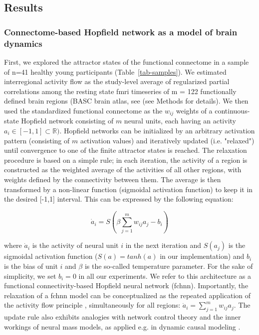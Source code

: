 \documentclass{article}
\begin{document}
\subsection{Results}

\subsubsection{Connectome-based Hopfield network as a model of brain dynamics}

First, we explored the attractor states of the functional connectome in a sample of n=41 healthy young
participants (Table~\ref{tab-samples}). We estimated interregional activity flow \citep{cole2016activity, ito2017cognitive}
as the study-level average of regularized partial correlations among the resting state \acrshort{fmri} timeseries of m = 122
functionally defined brain regions (BASC brain atlas, see (see Methods for details). We then used the standardized
functional connectome as the $w_{ij}$  weights of a continuous-state Hopfield network
\citep{hopfield1982neural, koiran1994dynamics} consisting of $m$ neural units, each having an activity
$a_i \in [ -1,1] \subset \mathbb{R})$. Hopfield networks can be initialized by an arbitrary activation pattern (consisting of
$m$ activation values) and iteratively updated (i.e. "relaxed") until convergence to one of the finite attractor states is reached. The relaxation procedure is based on a simple rule; in each iteration, the activity of a region is constructed as the weighted average of the activities of all other regions, with weights defined by the connectivity between them. The average is then transformed by a non-linear function (sigmoidal activation function) to keep it in the desired [-1,1] interval.
This can be expressed by the following equation:

\begin{equation}
\label{hopfield-update}
\dot{a}_i = S(\beta \sum_{j=1}^m w_{ij}a_j - b_i)
\end{equation}

where $\dot{a}_i$ is the activity of neural unit $i$ in the next iteration and $S(a_j)$ is the sigmoidal activation
function ($S(a) = tanh(a)$ in our implementation) and $b_i$ is the bias of unit $i$ and $\beta$ is the so-called temperature parameter. For the sake of simplicity, we set $b_i=0$ in all our experiments. We refer to this architecture as a functional connectivity-based Hopfield neural network (\acrshort{fchnn}). Importantly, the relaxation of a \acrshort{fchnn} model can be conceptualized as the repeated
application of the activity flow principle \citep{cole2016activity, ito2017cognitive} , simultaneously for all
regions: $\dot{a}_i = \sum_{j=1}^m w_{ij}a_j$. The update rule also exhibits analogies with network control theory \citep{gu2015controllability} and the inner workings of neural mass models, as applied e.g. in dynamic causal modeling \citep{daunizeau2012stochastic}.
\end{document}
